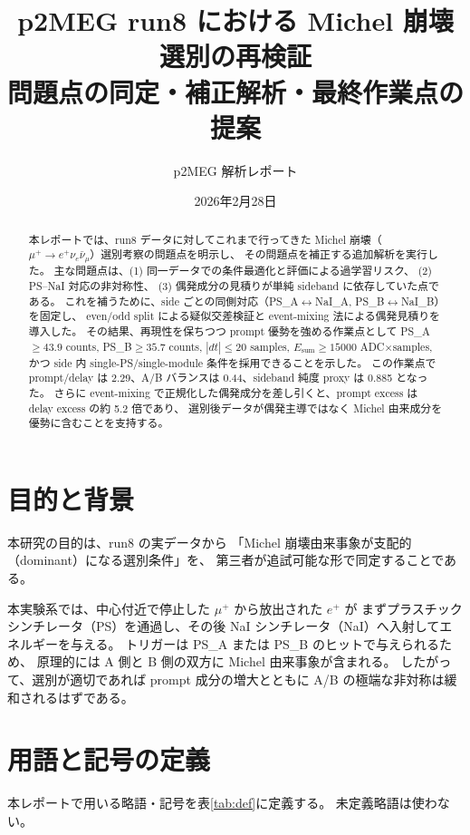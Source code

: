 \documentclass[a4paper,11pt]{jsarticle}
\title{p2MEG run8 における Michel 崩壊選別の再検証\\
問題点の同定・補正解析・最終作業点の提案}
\author{p2MEG 解析レポート}
\date{2026年2月28日}
\begin{document}
\maketitle

\begin{abstract}
本レポートでは、run8 データに対してこれまで行ってきた Michel 崩壊（$\mu^+ \to e^+ \nu_e \bar{\nu}_\mu$）選別考察の問題点を明示し、
その問題点を補正する追加解析を実行した。
主な問題点は、(1) 同一データでの条件最適化と評価による過学習リスク、
(2) PS--NaI 対応の非対称性、
(3) 偶発成分の見積りが単純 sideband に依存していた点である。
これを補うために、side ごとの同側対応（PS\_A$\leftrightarrow$NaI\_A, PS\_B$\leftrightarrow$NaI\_B）を固定し、
even/odd split による疑似交差検証と event-mixing 法による偶発見積りを導入した。
その結果、再現性を保ちつつ prompt 優勢を強める作業点として
PS\_A$\ge 43.9$ counts, PS\_B$\ge 35.7$ counts, $|dt|\le 20$ samples, $E_{\mathrm{sum}}\ge 15000$ ADC$\times$samples,
かつ side 内 single-PS/single-module 条件を採用できることを示した。
この作業点で prompt/delay は 2.29、A/B バランスは 0.44、sideband 純度 proxy は 0.885 となった。
さらに event-mixing で正規化した偶発成分を差し引くと、prompt excess は delay excess の約 5.2 倍であり、
選別後データが偶発主導ではなく Michel 由来成分を優勢に含むことを支持する。
\end{abstract}

\section{目的と背景}
本研究の目的は、run8 の実データから
「Michel 崩壊由来事象が支配的（dominant）になる選別条件」を、
第三者が追試可能な形で同定することである。

本実験系では、中心付近で停止した $\mu^+$ から放出された $e^+$ が
まずプラスチックシンチレータ（PS）を通過し、その後 NaI シンチレータ（NaI）へ入射してエネルギーを与える。
トリガーは PS\_A または PS\_B のヒットで与えられるため、
原理的には A 側と B 側の双方に Michel 由来事象が含まれる。
したがって、選別が適切であれば prompt 成分の増大とともに A/B の極端な非対称は緩和されるはずである。

\section{用語と記号の定義}
本レポートで用いる略語・記号を表\ref{tab:def}に定義する。
未定義略語は使わない。
\end{document}
